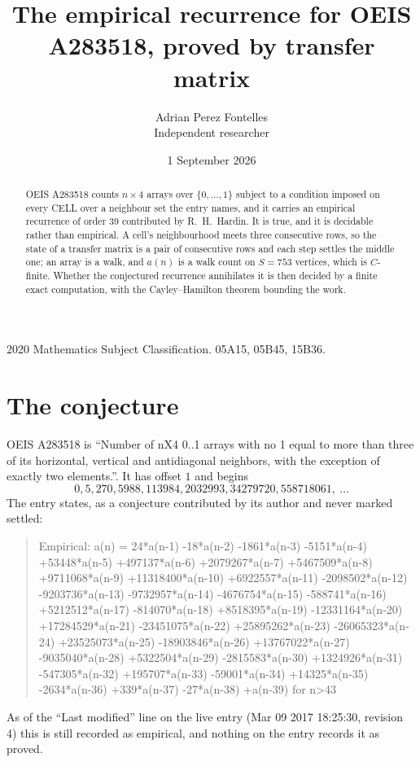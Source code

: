 \documentclass[11pt,a4paper]{article}
\title{The empirical recurrence for OEIS A283518, proved by transfer matrix}
\author{Adrian Perez Fontelles\\ \small Independent researcher}
\date{1 September 2026}
\theoremstyle{plain}
\theoremstyle{definition}
\begin{document}
\maketitle

\begin{abstract}
OEIS A283518 counts $n\times4$ arrays over $\{0,\dots,1\}$ subject to a condition imposed on
every CELL over a neighbour set the entry names, and it carries an empirical recurrence of
order $39$ contributed by R.~H.~Hardin. It is true, and it is decidable rather than
empirical. A cell's neighbourhood meets three consecutive rows, so the state of a transfer
matrix is a pair of consecutive rows and each step settles the middle one; an array is a
walk, and $a(n)$ is a walk count on $S=753$ vertices, which is $C$-finite. Whether the
conjectured recurrence annihilates it is then decided by a finite exact computation, with the
Cayley--Hamilton theorem bounding the work.
\end{abstract}

\noindent\small 2020 Mathematics Subject Classification. 05A15, 05B45, 15B36.\normalsize

\section{The conjecture}

OEIS A283518 is ``Number of nX4 0..1 arrays with no 1 equal to more than three of its horizontal, vertical and antidiagonal neighbors, with the exception of exactly two elements.''. It has offset $1$ and begins
\[
0, 5, 270, 5988, 113984, 2032993, 34279720, 558718061,\ \dots
\]
The entry states, as a conjecture contributed by its author and never marked settled:
\begin{quote}
Empirical: a(n) = 24*a(n-1) -18*a(n-2) -1861*a(n-3) -5151*a(n-4) +53448*a(n-5) +497137*a(n-6) +2079267*a(n-7) +5467509*a(n-8) +9711068*a(n-9) +11318400*a(n-10) +6922557*a(n-11) -2098502*a(n-12) -9203736*a(n-13) -9732957*a(n-14) -4676754*a(n-15) -588741*a(n-16) +5212512*a(n-17) -814070*a(n-18) +8518395*a(n-19) -12331164*a(n-20) +17284529*a(n-21) -23451075*a(n-22) +25895262*a(n-23) -26065323*a(n-24) +23525073*a(n-25) -18903846*a(n-26) +13767022*a(n-27) -9035040*a(n-28) +5322504*a(n-29) -2815583*a(n-30) +1324926*a(n-31) -547305*a(n-32) +195707*a(n-33) -59001*a(n-34) +14325*a(n-35) -2634*a(n-36) +339*a(n-37) -27*a(n-38) +a(n-39) for n>43
\end{quote}
As of the ``Last modified'' line on the live entry (Mar 09 2017 18:25:30, revision 4) this is still
recorded as empirical, and nothing on the entry records it as proved.
\end{document}
